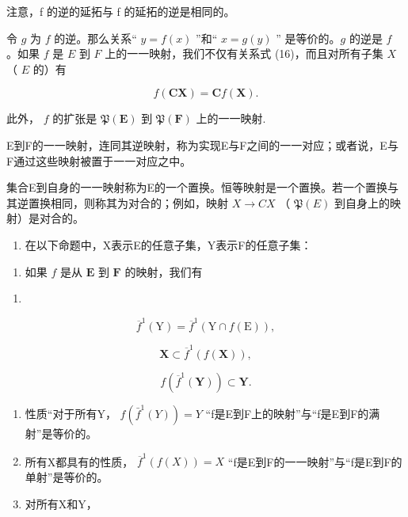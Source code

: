 注意，f 的逆的延拓与 f 的延拓的逆是相同的。

令 \(g\) 为 \(f\) 的逆。那么关系“ \(y = f(x)\) ”和“ \(x = g(y)\) '' 是等价的。\(g\) 的逆是 \(f\) 。如果 \(f\) 是 \(E\) 到 \(F\) 上的一一映射，我们不仅有关系式 (16)，而且对所有子集 \(X\) （ \(E\) 的）有

\[
f (\mathbf {C X}) = \mathbf {C} f (\mathbf {X}).
\]

此外， \(f\) 的扩张是 \(\mathfrak{P}(\mathbf{E})\) 到 \(\mathfrak{P}(\mathbf{F})\) 上的一一映射.

E到F的一一映射，连同其逆映射，称为实现E与F之间的一一对应；或者说，E与F通过这些映射被置于一一对应之中。

集合E到自身的一一映射称为E的一个置换。恒等映射是一个置换。若一个置换与其逆置换相同，则称其为对合的；例如，映射 \(X \rightarrow C X\) （ \(\mathfrak{P}(E)\) 到自身上的映射）是对合的。

\begin{enumerate}
\def\labelenumi{\arabic{enumi}.}
\setcounter{enumi}{9}
\tightlist
\item
  在以下命题中，X表示E的任意子集，Y表示F的任意子集：
\end{enumerate}

\begin{enumerate}
\def\labelenumi{(\alph{enumi})}
\tightlist
\item
  如果 \(f\) 是从 \(\mathbf{E}\) 到 \(\mathbf{F}\) 的映射，我们有
\end{enumerate}

\begin{enumerate}
\def\labelenumi{(\arabic{enumi})}
\setcounter{enumi}{16}
\tightlist
\item
\end{enumerate}

\[
\overline {{{f}}} ^ {1} (\mathrm{Y}) = \overline {{{f}}} ^ {1} (\mathrm{Y} \cap f (\mathrm{E})),\tag{18}
\]

\[
\mathbf {X} \subset \overline {{f}} ^ {1} (f (\mathbf {X})),\tag{19}
\]

\[
f (\overline {{f}} ^ {1} (\mathbf {Y})) \subset \mathbf {Y}.
\]

\begin{enumerate}
\def\labelenumi{(\alph{enumi})}
\setcounter{enumi}{1}
\item
  性质“对于所有Y， \(f(\bar{f}^{1}(Y)) = Y\) “f是E到F上的映射”与“f是E到F的满射”是等价的。
\item
  所有X都具有的性质， \(\overline{f}^{1}(f(X)) = X\) “f是E到F的一一映射”与“f是E到F的单射”是等价的。
\item
  对所有X和Y，
\end{enumerate}


